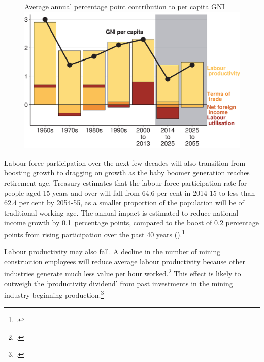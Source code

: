 \begin{figure}[t]
%
{Average annual percentage point contribution to per capita GNI}
\includegraphics[width=\columnwidth]{Fiscal-challenges/figure/Figure5-1.pdf}

\end{figure} 

Labour force participation over the next few decades will also transition from boosting growth to dragging on growth as the baby boomer generation reaches retirement age. Treasury estimates that the labour force participation rate for people aged 15 years and over will fall from 64.6 per cent in 2014-15 to less than 62.4 per cent by 2054-55, as a smaller proportion of the population will be of traditional working age.  The annual impact is estimated to reduce national income growth by 0.1~percentage points, compared to the boost of 0.2 percentage points from rising participation over the past 40 years ().\footcite[][pp.~ix,xi]{Hockey2015IGR}  

Labour productivity may also fall. A decline in the number of mining construction employees will reduce average labour productivity because other industries generate much less value per hour worked.\footcite{Borland2014}  This effect is likely to outweigh the ‘productivity dividend’ from past investments in the mining industry beginning production.\footcite[][12]{Commission2014} 

